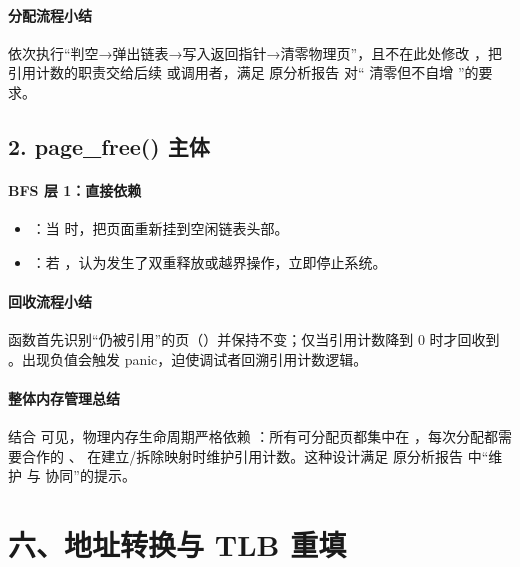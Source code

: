 \documentclass[12pt,oneside]{ctexbook}
\begin{document}
\paragraph{分配流程小结}
依次执行“判空→弹出链表→写入返回指针→清零物理页”，且不在此处修改 ，把引用计数的职责交给后续  或调用者，满足 原分析报告 对“ 清零但不自增 ”的要求。

\subsection*{2. page\_free() 主体}

\paragraph{BFS 层 1：直接依赖}
\begin{itemize}
    \item {}：当  时，把页面重新挂到空闲链表头部。
    \item {}：若 ，认为发生了双重释放或越界操作，立即停止系统。
\end{itemize}

\paragraph{回收流程小结}
函数首先识别“仍被引用”的页（）并保持不变；仅当引用计数降到 0 时才回收到 。出现负值会触发 panic，迫使调试者回溯引用计数逻辑。

\paragraph{整体内存管理总结}
结合  可见，物理内存生命周期严格依赖 ：所有可分配页都集中在 ，每次分配都需要合作的 、 在建立/拆除映射时维护引用计数。这种设计满足 原分析报告 中“维护  与  协同”的提示。
\section*{六、地址转换与 TLB 重填}
\end{document}
